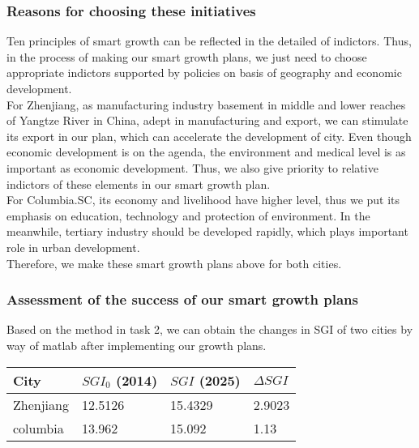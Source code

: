 \documentclass{mcmthesis}
\begin{document}
\subsubsection{Reasons for choosing these initiatives}%
Ten principles of smart growth can be reflected in the detailed of indictors. Thus, in the process of making our smart growth plans, we just need to choose appropriate indictors supported by policies on basis of geography and economic development.\\

\noindent For Zhenjiang, as manufacturing industry basement in middle and lower reaches of Yangtze River in China, adept in manufacturing and export, we can stimulate its export in our plan, which can accelerate the development of city. Even though economic development is on the agenda, the environment and medical level is as important as economic development. Thus, we also give priority to relative indictors of these elements in our smart growth plan. \\
For Columbia.SC, its economy and livelihood have higher level, thus we put its emphasis on education, technology and protection of environment. In the meanwhile, tertiary industry should be developed rapidly, which plays important role in urban development. \\
\noindent Therefore, we make these smart growth plans above for both cities. \\
\subsubsection{Assessment of the success of our smart growth plans}%
Based on the method in task 2, we can obtain the changes in SGI of two cities by way of matlab after implementing our growth plans.\\
\begin{table}[h]
\setlength{\abovecaptionskip}{0pt}
\setlength{\belowcaptionskip}{0pt}
\begin{tabular}{p{3cm}|p{3cm}|p{3cm}|p{3cm}}
\hline
City	& $SGI_0$ (2014)	& $SGI$ (2025)	& $\Delta SGI$ \\
\hline
Zhenjiang	& 12.5126	& 15.4329	& 2.9023 \\
columbia	& 13.962	& 15.092	& 1.13\\
\hline
\end{tabular}
\end{table}
\end{document}
